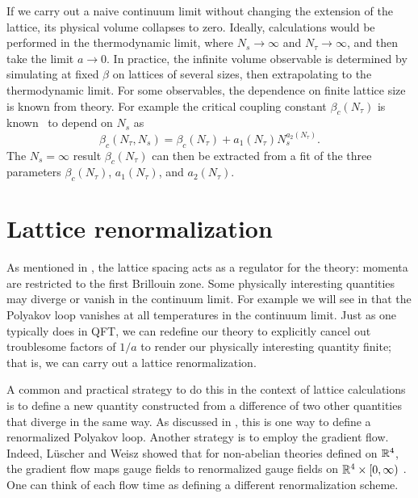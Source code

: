 If we carry out a naive continuum limit without changing the
extension of the lattice, its physical volume collapses to zero.
Ideally, calculations would be performed 
in 
the thermodynamic limit,
where $N_s\to\infty$ and $N_\tau\to\infty$, and then take the limit
$a\to0$. In practice, the infinite volume observable is determined
by simulating at fixed $\beta$ on lattices of several sizes, then
extrapolating to the thermodynamic limit.
For some observables, the dependence on finite lattice size is known
from theory. For example the critical coupling constant $\beta_c(N_\tau)$
is known~\cite{engels_critical_1996} to depend on $N_s$ as
\begin{equation}
  \beta_c(N_\tau,N_s)=\beta_c(N_\tau)+a_1(N_\tau)N_s^{a_2(N_\tau)}.
\end{equation}
The $N_s=\infty$ result $\beta_c(N_\tau)$ can then
be extracted from a fit of the three parameters $\beta_c(N_\tau)$,
$a_1(N_\tau)$, and $a_2(N_\tau)$.

\section{Lattice renormalization}\label{sec:renorm}

As mentioned in , the lattice spacing acts as a regulator for
the theory: momenta are restricted to the first Brillouin zone. Some physically
interesting quantities may diverge or vanish in the continuum limit.
For example we will see in  that the Polyakov loop vanishes at
all temperatures in the continuum limit. Just as one typically does in QFT, we
can redefine our theory to explicitly cancel out troublesome factors of $1/a$ to
render our physically interesting quantity finite; that is, we can carry out a
lattice renormalization.

A common and practical strategy to do this in the context of lattice
calculations is to define a new quantity constructed from a difference of two
other quantities that diverge in the same way. As discussed in
, this is one way to define a renormalized Polyakov loop.
Another strategy is to employ the gradient flow. Indeed, L\"uscher and Weisz
showed that for non-abelian theories defined on $\mathbb{R}^4$, the gradient flow maps
gauge fields to renormalized gauge fields on $\mathbb{R}^4\times[0,\infty)$
\cite{luscher_perturbative_2011}.
One can think of each flow time as defining a different renormalization scheme.


